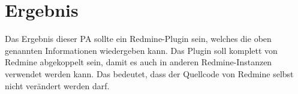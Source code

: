 \section{Ergebnis}

Das Ergebnis dieser PA sollte ein Redmine-Plugin sein, welches die oben genannten Informationen wiedergeben kann. \newline
Das Plugin soll komplett von Redmine abgekoppelt sein, damit es auch in anderen Redmine-Instanzen verwendet werden kann.
Das bedeutet, dass der Quellcode von Redmine selbst nicht verändert werden darf. \newline
